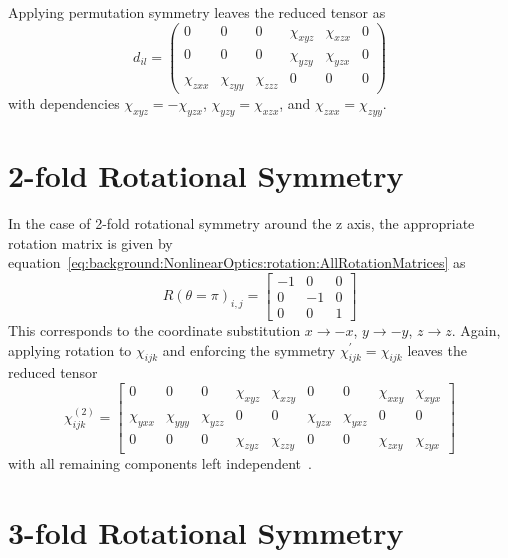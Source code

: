 Applying permutation symmetry leaves the reduced tensor as
\begin{equation}\label{eq:Reduced4fold}
	d_{il} = 
	\begin{pmatrix}
		0 & 0 & 0 & \chi_{xyz} & \chi_{xzx} & 0\\ 
		0 & 0 & 0 & \chi_{yzy} & \chi_{yzx} & 0\\ 
		\chi_{zxx} & \chi_{zyy} & \chi_{zzz} & 0 & 0 & 0
	\end{pmatrix} 
\end{equation}
with dependencies $\chi_{xyz} = -\chi_{yzx}$, $\chi_{yzy} = \chi_{xzx}$, and $\chi_{zxx} = \chi_{zyy}$.


\section{2-fold Rotational Symmetry}\label{sec:appendix:rotations:2foldrot}

In the case of 2-fold rotational symmetry around the z axis, the appropriate rotation matrix is given by equation~\ref{eq:background:NonlinearOptics:rotation:AllRotationMatrices} as
\begin{equation}\label{eq:piRotationMatrix}
	R(\theta=\pi)_{i,j} =
	\begin{bmatrix}
		-1 & 0 & 0\\ 
		0 & -1 & 0\\ 
		0 & 0 & 1
	\end{bmatrix}
\end{equation}
This corresponds to the coordinate substitution $x\rightarrow-x$, $y\rightarrow-y$, $z\rightarrow z$. Again, applying rotation to $\chi_{ijk}$ and enforcing the symmetry $\chi_{ijk}^{\prime}=\chi_{ijk}$ leaves the reduced tensor
\begin{equation}\label{eq:2foldChi}
	\chi^{(2)}_{ijk} =
	\begin{bmatrix}
		0 & 0 & 0 & \chi_{xyz} & \chi_{xzy} & 0 & 0 & \chi_{xxy} & \chi_{xyx}\\ 
		\chi_{yxx} & \chi_{yyy} & \chi_{yzz} & 0 & 0 & \chi_{yzx} & \chi_{yxz} & 0 & 0\\ 
		0 & 0 & 0 & \chi_{zyz} & \chi_{zzy} & 0 & 0 & \chi_{zxy} & \chi_{zyx}
	\end{bmatrix}
\end{equation}
with all remaining components left independent~\cite{Boyd2008a}. 

\section{3-fold Rotational Symmetry}\label{sec:appendix:rotations:3foldrot}

